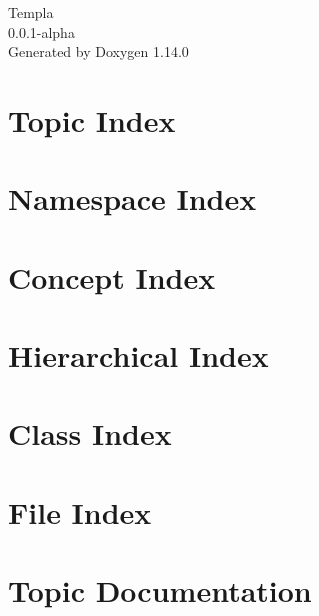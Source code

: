 \documentclass[twoside]{book}
\newcommand{\+}{\discretionary{\mbox{\scriptsize$\hookleftarrow$}}{}{}}
\newcommand{\clearemptydoublepage}{%
    \newpage{\pagestyle{empty}\cleardoublepage}%
  }
\begin{document}
  \raggedbottom
    \hypersetup{pageanchor=false,
                bookmarksnumbered=true,
                pdfencoding=unicode
               }
  \begin{titlepage}
  \vspace*{7cm}
  \begin{center}%
  {\Large Templa}\\
  [1ex]\large 0.\+0.\+1-\/alpha \\
  \vspace*{1cm}
  {\large Generated by Doxygen 1.14.0}\\
  \end{center}
  \end{titlepage}
  \clearemptydoublepage
  \tableofcontents
  \clearemptydoublepage
  \hypersetup{pageanchor=true}
\chapter{Topic Index}

\chapter{Namespace Index}

\chapter{Concept Index}

\chapter{Hierarchical Index}

\chapter{Class Index}

\chapter{File Index}

\chapter{Topic Documentation}









\end{document}
